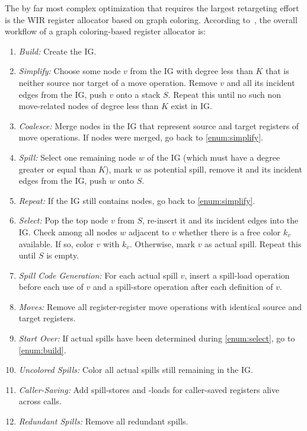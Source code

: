 The by far most complex optimization that requires the largest retargeting effort is the \gls{WIR} register allocator based on graph coloring.
According to~\cite{Brig92,Much97,Appel04}, the overall workflow of a graph coloring-based register allocator is:
\begin{enumerate}
  \item \emph{Build:}\label{enum:build} Create the \gls{IG}.
  \item \emph{Simplify:}\label{enum:simplify} Choose some node $v$ from the \gls{IG} with degree less than $K$ that is neither source nor target of a move operation.
  Remove $v$ and all its incident edges from the \gls{IG}, push $v$ onto a stack $S$.
  Repeat this until no such non move-related nodes of degree less than $K$ exist in \gls{IG}.
  \item \emph{Coalesce:}\label{enum:coalesce} Merge nodes in the \gls{IG} that represent source and target registers of move operations.
  If nodes were merged, go back to \cref{enum:simplify}.
  \item \emph{Spill:}\label{enum:spill} Select one remaining node $w$ of the \gls{IG} (which must have a degree greater or equal than $K$), mark $w$ as potential spill, remove it and its incident edges from the \gls{IG}, push $w$ onto $S$.
  \item \emph{Repeat:} If the \gls{IG} still contains nodes, go back to \cref{enum:simplify}.
  \item \emph{Select:}\label{enum:select} Pop the top node $v$ from $S$, re-insert it and its incident edges into the \gls{IG}.
  Check among all nodes $w$ adjacent to $v$ whether there is a free color $k_v$ available.
  If so, color $v$ with $k_v$.
  Otherwise, mark $v$ as actual spill.
  Repeat this until $S$ is empty.
  \item \emph{Spill Code Generation:}\label{enum:spillcode} For each actual spill $v$, insert a spill-load operation before each use of $v$ and a spill-store operation after each definition of $v$.
  \item \emph{Moves:}\label{enum:moves} Remove all register-register move operations with identical source and target registers.
  \item \emph{Start Over:}\label{enum:startover} If actual spills have been determined during \cref{enum:select}, go to \cref{enum:build}.
  \item \emph{Uncolored Spills:}\label{enum:uncolspills} Color all actual spills still remaining in the \gls{IG}.
  \item \emph{Caller-Saving:}\label{enum:callsave} Add spill-stores and -loads for caller-saved registers alive across calls.
  \item \emph{Redundant Spills:}\label{enum:redspills} Remove all redundant spills.
\end{enumerate}

